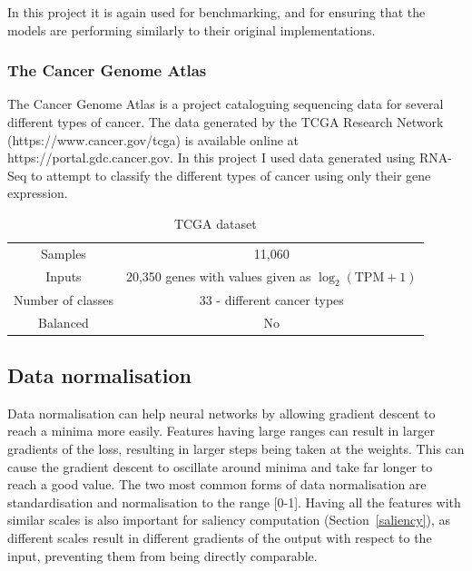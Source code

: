 In this project it is again used for benchmarking, and for ensuring that the models are performing similarly to their original implementations.

\subsubsection{The Cancer Genome Atlas}
The Cancer Genome Atlas is a project cataloguing sequencing data for several different types of cancer. The data generated by the TCGA Research 
Network (https://www.cancer.gov/tcga) is available online at https://portal.gdc.cancer.gov. In this project I used data generated using 
RNA-Seq to attempt to classify the different types of cancer using only their gene expression.
\begin{table}[H]
  \label{tab:tcga_dataset}
  \small %
  \centering %
  \begin{tabular}{cc} %
  \toprule[\heavyrulewidth]
  Samples & 11,060 \\
  Inputs & 20,350 genes with values given as $\log_{2}(\text{TPM}+1)$ \footnotemark \\
  Number of classes & 33 - different cancer types\\
  Balanced & No \\
  \bottomrule[\heavyrulewidth] 
  \end{tabular}
  \caption{TCGA dataset} 
\end{table}

\subsection{Data normalisation} \label{normalise}
Data normalisation can help neural networks by allowing gradient descent to reach a minima more easily. Features having large ranges
can result in larger gradients of the loss, resulting in larger steps being taken at the weights. This can cause the 
gradient descent to oscillate around minima and take far longer to reach a good value. The two most common forms of data normalisation 
are standardisation and normalisation to the range [0-1]. Having all the features with similar scales is also important for saliency computation
(Section~\ref{saliency}),
as different scales result in different gradients of the output with respect to the input, preventing them from being directly comparable.

